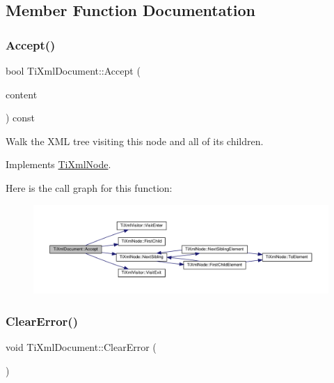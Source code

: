 \subsection{Member Function Documentation}
\mbox{\label{classTiXmlDocument_a8ddd6eec722cbd25900bbac664909bac}} 
\subsubsection{\texorpdfstring{Accept()}{Accept()}}
{\footnotesize\ttfamily bool Ti\+Xml\+Document\+::\+Accept (\begin{DoxyParamCaption}\item[{\hyperlink{classTiXmlVisitor}{Ti\+Xml\+Visitor} $\ast$}]{content }\end{DoxyParamCaption}) const\hspace{0.3cm}{\ttfamily [virtual]}}

Walk the X\+ML tree visiting this node and all of its children. 

Implements \hyperlink{classTiXmlNode_acc0f88b7462c6cb73809d410a4f5bb86}{Ti\+Xml\+Node}.

Here is the call graph for this function\+:
\nopagebreak
\begin{figure}[H]
\begin{center}
\leavevmode
\includegraphics[width=350pt]{classTiXmlDocument_a8ddd6eec722cbd25900bbac664909bac_cgraph}
\end{center}
\end{figure}
\mbox{\label{classTiXmlDocument_ac66b8c28db86363315712a3574e87c35}} 
\subsubsection{\texorpdfstring{Clear\+Error()}{ClearError()}}
{\footnotesize\ttfamily void Ti\+Xml\+Document\+::\+Clear\+Error (\begin{DoxyParamCaption}{ }\end{DoxyParamCaption})\hspace{0.3cm}{\ttfamily [inline]}}

